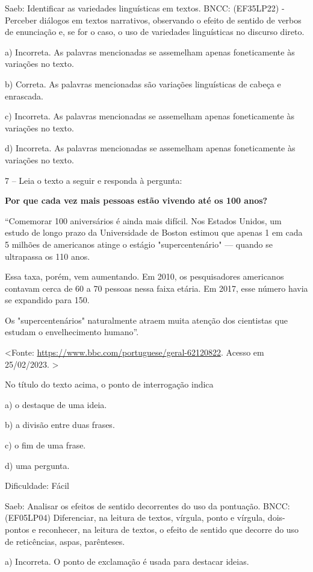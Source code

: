 Saeb: Identificar as variedades linguísticas em textos. BNCC: (EF35LP22)
- Perceber diálogos em textos narrativos, observando o efeito de sentido
de verbos de enunciação e, se for o caso, o uso de variedades
linguísticas no discurso direto.

a) Incorreta. As palavras mencionadas se assemelham apenas foneticamente
às variações no texto.

b) Correta. As palavras mencionadas são variações linguísticas de cabeça
e enrascada.

c) Incorreta. As palavras mencionadas se assemelham apenas foneticamente
às variações no texto.

d) Incorreta. As palavras mencionadas se assemelham apenas foneticamente
às variações no texto.

7 -- Leia o texto a seguir e responda à pergunta:

\textbf{Por que cada vez mais pessoas estão vivendo até os 100 anos?}

``Comemorar 100 aniversários é ainda mais difícil. Nos Estados Unidos,
um estudo de longo prazo da Universidade de Boston estimou que apenas 1
em cada 5 milhões de americanos atinge o estágio "supercentenário" ---
quando se ultrapassa os 110 anos.

Essa taxa, porém, vem aumentando. Em 2010, os pesquisadores americanos
contavam cerca de 60 a 70 pessoas nessa faixa etária. Em 2017, esse
número havia se expandido para 150.

Os "supercentenários" naturalmente atraem muita atenção dos cientistas
que estudam o envelhecimento humano''.

\textless{}Fonte: \url{https://www.bbc.com/portuguese/geral-62120822}.
Acesso em 25/02/2023. \textgreater{}

No título do texto acima, o ponto de interrogação indica

a) o destaque de uma ideia.

b) a divisão entre duas frases.

c) o fim de uma frase.

d) uma pergunta.

Dificuldade: Fácil

Saeb: Analisar os efeitos de sentido decorrentes do uso da pontuação.
BNCC: (EF05LP04) Diferenciar, na leitura de textos, vírgula, ponto e
vírgula, dois-pontos e reconhecer, na leitura de textos, o efeito de
sentido que decorre do uso de reticências, aspas, parênteses.

a) Incorreta. O ponto de exclamação é usada para destacar ideias.

